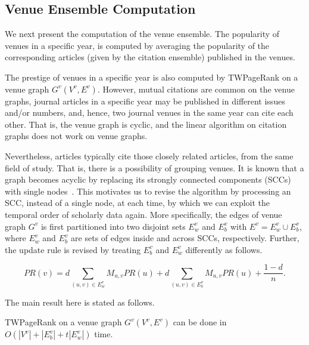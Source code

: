 {\subsection{Venue Ensemble Computation}
\label{subsec-venue}






We next present the computation of the venue ensemble.
The popularity of venues in a specific year, is computed by averaging the popularity of the corresponding articles (given by the citation ensemble) published in the venues.

The prestige of venues in a specific year  is also computed by TWPageRank on a venue graph  $G^v(V^v, E^v)$. However, mutual citations are common on the venue graphs, \eg journal articles in a specific year may be published in different issues and/or numbers, and, hence, two journal venues in the same year can cite each other. That is, the venue graph is cyclic, and the linear algorithm on citation graphs does not work on venue graphs.

Nevertheless, articles typically cite those closely related articles, \eg from the same field of study. That is, there is a possibility of grouping venues.
It is known that a graph becomes acyclic by replacing its strongly connected components (SCCs) with single nodes~\cite{CormenLRS01}.
This motivates us to revise the algorithm by processing an SCC, instead of a single node, at each time, by which we can exploit the temporal order of scholarly data again.
%
More specifically, the edges of venue graph $G^v$ is first partitioned into two disjoint sets $E^v_w$ and $E^v_b$ with $E^v=E^v_w \cup E^v_b$, where $E^v_w$ and $E^v_b$ are sets of edges inside and across SCCs, respectively. Further, the update rule is revised by treating $E^v_b$ and $E^v_w$ differently as follows.
\begin{small}
\begin{equation}\label{eq-prscc}
PR(v) =  d \sum_{(u,v)\in E^v_w} M_{u,v} PR(u)
  + d \sum_{(u,v)\in E^v_b} M_{u,v} PR(u) +  \frac{1-d}{n}.
\end{equation}
\end{small}


\vspace{-2ex}
The main result here is stated as follows.

\begin{theorem}
\label{thm-venue}
TWPageRank on a venue graph $G^v(V^v, E^v)$ can be done in  $O(|V^v|+|E^v_b|+t|E^v_w|)$ time.
\end{theorem}


}
